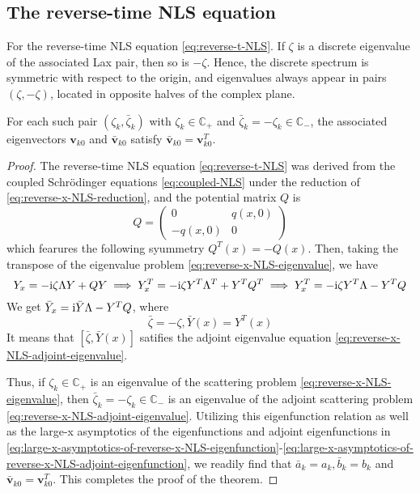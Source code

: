 \subsection{The reverse-time NLS equation}
\begin{theorem}
    For the reverse-time NLS equation \eqref{eq:reverse-t-NLS}. If $\zeta$ is a discrete eigenvalue of the associated Lax pair, then so is $-\zeta$. Hence, the discrete spectrum is symmetric with respect to the origin, and eigenvalues always appear in pairs $(\zeta, -\zeta)$, located in opposite halves of the complex plane.

    For each such pair $(\zeta_k, \bar{\zeta}_k)$ with $\zeta_k \in \mathbb{C}_+$ and $\bar{\zeta}_k = -\zeta_k \in \mathbb{C}_-$, the associated eigenvectors $\mathbf{v}_{k0}$ and $\bar{\mathbf{v}}_{k0}$ satisfy $ \bar{\mathbf{v}}_{k0} = \mathbf{v}_{k0}^{T} $.
\end{theorem}
\begin{proof}
    The reverse-time NLS equation \eqref{eq:reverse-t-NLS} was derived from the coupled Schrödinger equations \eqref{eq:coupled-NLS} under the reduction of \eqref{eq:reverse-x-NLS-reduction}, and the potential matrix $ Q $ is
    \begin{equation}
        Q = \begin{pmatrix}
            0 & q(x,0) \\
            -q(x,0) & 0
        \end{pmatrix}
    \end{equation}
    which fearures the following syummetry $ Q^{T}(x) = -Q(x) $. Then, taking the transpose of the eigenvalue problem \eqref{eq:reverse-x-NLS-eigenvalue}, we have
    \begin{equation}
            Y_{x} = - \mathrm{i} \zeta \Lambda Y + QY \implies Y_{x}^{T} = -\mathrm{i} \zeta Y^{T} \Lambda^{T} + Y^{T} Q^{T} \implies Y_{x}^{T} = -\mathrm{i} \zeta Y^{T} \Lambda - Y^{T}Q
    \end{equation}
    We get $ \bar{Y}_{x} = \mathrm{i} \bar{Y} \Lambda - Y^{T}Q $, where
    \begin{equation}
        \bar{\zeta} = -\zeta, \bar{Y}(x) = Y^{T}(x)
    \end{equation} 
    It means that $ [\bar{\zeta}, \bar{Y}(x)] $ satifies the adjoint eigenvalue equation \eqref{eq:reverse-x-NLS-adjoint-eigenvalue}. 

    Thus, if $ \zeta_{k} \in \mathbb{C}_{+} $ is an eigenvalue of the scattering problem \eqref{eq:reverse-x-NLS-eigenvalue}, then $ \bar{\zeta}_{k} = -\zeta_{k} \in \mathbb{C}_{-} $ is an eigenvalue of the adjoint scattering problem \eqref{eq:reverse-x-NLS-adjoint-eigenvalue}. Utilizing this eigenfunction relation as well as the large-x asymptotics of the eigenfunctions and adjoint eigenfunctions in \eqref{eq:large-x-asymptotics-of-reverse-x-NLS-eigenfunction}-\eqref{eq:large-x-asymptotics-of-reverse-x-NLS-adjoint-eigenfunction}, we readily find that $ \bar{a}_{k} = a_{k}, \bar{b}_{k} = b_{k} $ and $ \bar{\mathbf{v}}_{k0} = \mathbf{v}_{k0}^{T} $. This completes the proof of the theorem.
   \end{proof}
